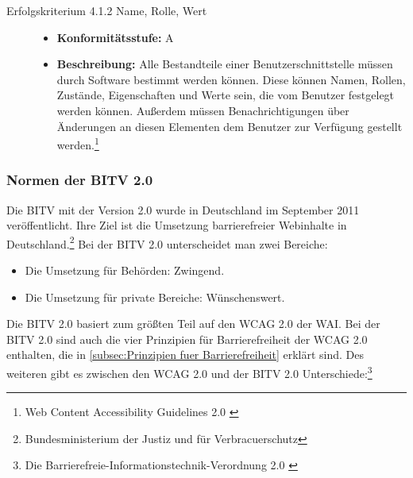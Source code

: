 \begin{description}
\begin{description}
		\item[Erfolgskriterium 4.1.2 Name, Rolle, Wert]\hfill
		\begin{itemize}
			\item \textbf{Konformitätsstufe:} A
			\item \textbf{Beschreibung:} Alle Bestandteile einer Benutzerschnittstelle müssen durch Software bestimmt werden können. Diese können 
			Namen, Rollen, Zustände, Eigenschaften und Werte sein, die vom Benutzer festgelegt werden können. Außerdem müssen Benachrichtigungen über Änderungen 
			an diesen Elementen dem Benutzer zur Verfügung gestellt werden.\footnote{Web Content Accessibility Guidelines 2.0 \cite{WCAG2.0}}
		\end{itemize}
	\end{description}
\end{description}

\subsubsection{Normen der \ac{BITV} 2.0}
Die \ac{BITV} mit der Version 2.0 wurde in Deutschland im September 2011 veröffentlicht. Ihre Ziel ist die Umsetzung barrierefreier Webinhalte in Deutschland.\footnote{Bundesministerium der Justiz und für Verbracuerschutz\cite{BITV}} Bei der \ac{BITV} 2.0 unterscheidet man zwei Bereiche:

\begin{itemize}
	\item Die Umsetzung für Behörden: Zwingend.
	\item Die Umsetzung für private Bereiche: Wünschenswert.
\end{itemize}

Die \ac{BITV} 2.0 basiert zum größten Teil auf den \ac{WCAG} 2.0 der \ac{WAI}. Bei der \ac{BITV} 2.0 sind auch die vier Prinzipien für Barrierefreiheit der \ac{WCAG} 2.0  enthalten, die in \cref{subsec:Prinzipien fuer Barrierefreiheit} erklärt sind. Des weiteren gibt es zwischen den \ac{WCAG} 2.0 und der \ac{BITV} 2.0 Unterschiede:\footnote{Die Barrierefreie-Informationstechnik-Verordnung 2.0 \cite{BITV}}


